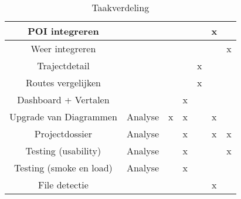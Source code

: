 \begin{table}[H]
\begin{tabular}{|c|c|c|c|c|c|c|}
POI integreren              &                                    &                      &                       &                      & x                     &                      \\ \hline
Weer integreren             &                                    &                      &                       &                      &                       & x                    \\ \hline
Trajectdetail               &                                    &                      &                       & x                    &                       &                      \\ \hline
Routes vergelijken          &                                    &                      &                       & x                    &                       &                      \\ \hline
Dashboard + Vertalen        & 		                             &                      & x                     &                      &                       &                      \\ \hline
Upgrade van Diagrammen      & Analyse                            & x                    & x                     &                      &  x                     &                      \\ \hline
Projectdossier              & Analyse                            &                      & x                     &                      & x                      &  x                   \\ \hline
Testing (usability)             &  Analyse                      &                      &  x                     &                      &                     &  x                   \\ \hline
Testing (smoke en load)             &  Analyse                      &                      &  x                     &                      &                     &                     \\ \hline  
File detectie               &                       &                      &                       &                      & x                     &                      \\ \hline                        
\end{tabular}
\caption{Taakverdeling}
\label{tab:taakverdeling}
\end{table}